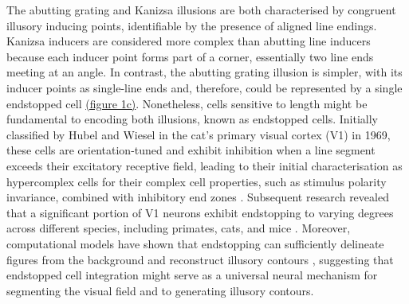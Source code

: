 \documentclass[12pt]{article}
\begin{document}
\bigbreak
The abutting grating and Kanizsa illusions are both characterised by congruent illusory inducing points, identifiable by the presence of aligned line endings. Kanizsa inducers are considered more complex than abutting line inducers because each inducer point forms part of a corner, essentially two line ends meeting at an angle. In contrast, the abutting grating illusion is simpler, with its inducer points as single-line ends and, therefore, could be represented by a single endstopped cell \hyperref[fig:figure_1]{(figure 1c)}.
Nonetheless, cells sensitive to length might be fundamental to encoding both illusions, known as endstopped cells. Initially classified by Hubel and Wiesel in the cat's primary visual cortex (V1) in 1969, these cells are orientation-tuned and exhibit inhibition when a line segment exceeds their excitatory receptive field, leading to their initial characterisation as hypercomplex cells for their complex cell properties, such as stimulus polarity invariance, combined with inhibitory end zones \autocite{hubelRECEPTIVEFIELDSFUNCTIONAL1965}. Subsequent research revealed that a significant portion of V1 neurons exhibit endstopping to varying degrees across different species, including primates, cats, and mice \autocite{deangelisLengthWidthTuning1994,jonesSurroundSuppressionPrimate2001,sceniakVisualSpatialCharacterization2001}. Moreover, computational models have shown that endstopping can sufficiently delineate figures from the background and reconstruct illusory contours \autocite{vonderheydtMechanismsContourPerception1989}, suggesting that endstopped cell integration might serve as a universal neural mechanism for segmenting the visual field and to generating illusory contours.
\end{document}
